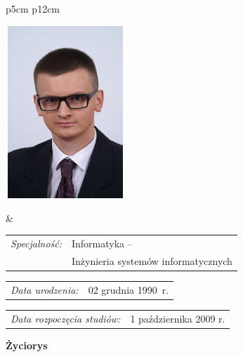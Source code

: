 \begin{titlepage}
    \newpage\thispagestyle{empty}
    \begin{tabular}{p{5cm} p{12cm}}
    \begin{minipage}{5cm}
    \center
    \includegraphics[height=6.5cm,width=4.5cm]{img/foto.jpg}
    \end{minipage}
    &
    \begin{minipage}{12cm}
    \begin{flushleft}
    \par\noindent\vspace{1\baselineskip}
    \begin{tabular}[h]{l l}
    {\normalsize\it Specjalność:} & Informatyka -- \\
    & Inżynieria systemów informatycznych
    \end{tabular}
    \par\noindent\vspace{1\baselineskip}
    \begin{tabular}[h]{l l}
    {\normalsize\it Data urodzenia:} & {\normalsize 02 grudnia 1990~r.}
    \end{tabular}
    \par\noindent\vspace{1\baselineskip}
    \begin{tabular}[h]{l l}
    {\normalsize\it Data rozpoczęcia studiów:} & {\normalsize 1 października 2009 r.}
    \end{tabular}
    \par\noindent\vspace{1\baselineskip}
    \end{flushleft}
    \end{minipage}
    \end{tabular}
    \vspace*{1\baselineskip}
    \begin{center}
	{\large\bfseries Życiorys}\par\bigskip

\end{center}
\end{titlepage}
